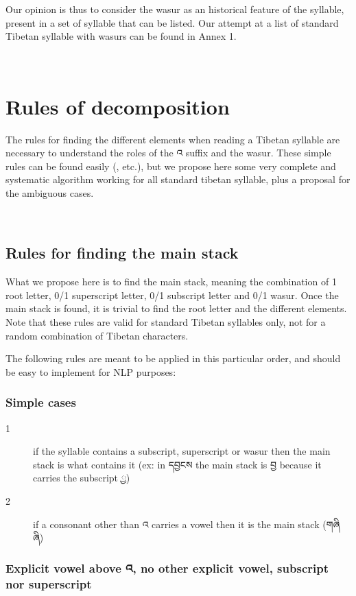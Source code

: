 \documentclass[%
a4paper,%
pagesize,%
12pt,%
parskip=off,%
bibliography=totoc,%
numbers=noenddot,%
DIV=12,%
twoside=semi,%
headings=normal%
]{scrartcl}
\begin{document}
Our opinion is thus to consider the wasur as an historical feature of the syllable, present in a set of syllable that can be listed. Our attempt at a list of standard Tibetan syllable with wasurs can be found in Annex 1.

­\section{Rules of decomposition}

The rules for finding the different elements when reading a Tibetan syllable are necessary to understand the roles of the འ suffix and the wasur. These simple rules can be found easily (\cite{TournadreMST}, etc.), but we propose here some very complete and systematic algorithm working for all standard tibetan syllable, plus a proposal for the ambiguous cases.

­\subsection{Rules for finding the main stack}

What we propose here is to find the main stack, meaning the combination of 1 root letter, 0/1 superscript letter, 0/1 subscript letter and 0/1 wasur. Once the main stack is found, it is trivial to find the root letter and the different elements. Note that these rules are valid for standard Tibetan syllables only, not for a random combination of Tibetan characters.

The following rules are meant to be applied in this particular order, and should be easy to implement for NLP purposes:

\subsubsection*{Simple cases}\label{decompositionrules}

\begin{description}
\item[1] if the syllable contains a subscript, superscript or wasur then the main stack is what contains it (ex: in དབྱངས the main stack is བྱ because it carries the subscript ྱ)
\item[2] if a consonant other than འ carries a vowel then it is the main stack (གཞི \rightarrow{} ཞི)
\end{description}

\subsubsection*{Explicit vowel above འ, no other explicit vowel, subscript nor superscript}
\end{document}
